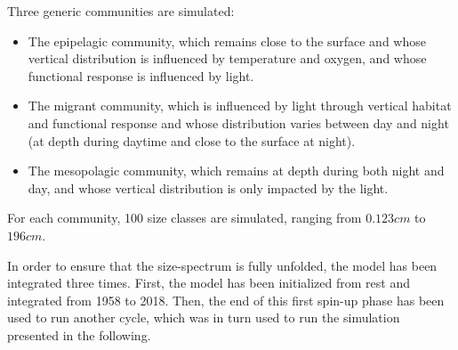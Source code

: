 %
%

Three generic communities are simulated:
\begin{itemize}
\item{The epipelagic community, which remains close to the surface and whose vertical distribution is influenced by temperature and oxygen, and whose functional response is influenced by light.}
\item{The migrant community, which is influenced by light through vertical habitat and functional response and whose distribution varies between day and night (at depth during daytime and close to the surface at night).}
\item{The  mesopolagic community, which remains at depth during both night and day, and whose vertical distribution is only impacted by the light.}
\end{itemize}

For each community, 100 size classes are simulated, ranging from $0.123cm$ to $196cm$.


In order to ensure that the size-spectrum is fully unfolded, the model has been integrated three times. First, the model has been initialized from rest and integrated from 1958 to 2018. Then, the end of this first spin-up phase has been used to run another cycle, which was in turn used to run the simulation presented in the following.

